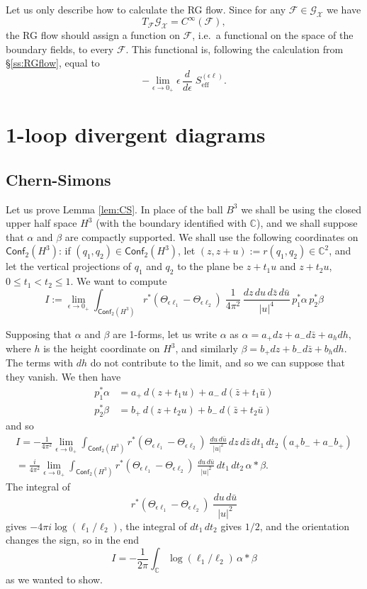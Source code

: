 \documentclass[a4paper]{amsart}
\theoremstyle{plain}
\theoremstyle{definition}
\newcommand{\mc}{\mathcal}
\newcommand{\C}{\mathbb{C}}
\newcommand{\cf}{\mathsf{Conf}}
\begin{document}
Let us only describe how to calculate the RG flow.
Since for any $\mc F\in\mc{G}_\mc X$ we have
$$T_\mc F \mc{G}_\mc X =C^\infty(\mc F), $$
the RG flow should assign a function on $\mc F$, i.e.\ a functional on the space of the boundary fields, to every $\mc F$. This functional is, following the calculation from \S\ref{ss:RGflow}, equal to
\begin{equation}\label{akszrg}
-\lim_{\epsilon\to0_+} \epsilon\,\frac d{d\epsilon}\; S_\text{eff}^{(\epsilon\ell)}.
\end{equation}



\appendix

\section{1-loop divergent diagrams}
\subsection{Chern-Simons}
Let us prove Lemma \ref{lem:CS}. In place of the ball $B^3$ we shall be using the closed upper half space $H^3$ (with the boundary identified with $\C$), and we shall suppose that $\alpha$ and $\beta$ are compactly supported. We shall use the following coordinates on $\cf_2(H^3)$: if $(q_1,q_2)\in\cf_2(H^3)$, let $(z,z+u):=r(q_1,q_2)\in\C^2$, and let the vertical projections of $q_1$ and $q_2$ to the plane be $z+t_1u$ and $z+t_2u$, $0\leq t_1<t_2\leq1$. We want to compute
$$I:=
\lim_{\epsilon\to0_+}\int_{\cf_2(H^3)}r^*(\Theta_{\epsilon\ell_1}-\Theta_{\epsilon\ell_2})\;\frac1{4\pi^2}\,\frac{dz\,du\,d\bar z\,d\bar u}{|u|^4}\,p_1^*\alpha\, p_2^*\beta
$$

Supposing that $\alpha$ and $\beta$ are 1-forms, let us write $\alpha$ as $\alpha=a_+dz + a_-d\bar z + a_h dh$, where $h$ is the height coordinate on $H^3$, and similarly 
$\beta=b_+dz + b_-d\bar z + b_h dh$. The terms with $dh$ do not contribute to the limit, and so we can suppose that they vanish. We then have
\begin{align*}
p_1^*\alpha&=a_+\, d(z+t_1 u) + a_-\, d(\bar z + t_1\bar u)\\
p_2^*\beta&=b_+\, d(z+t_2 u) + b_-\, d(\bar z + t_2\bar u)
\end{align*}
and so
\begin{multline*}
I=-\frac1{4\pi^2}\lim_{\epsilon\to0_+}\int_{\cf_2(H^3)}r^*(\Theta_{\epsilon\ell_1}-\Theta_{\epsilon\ell_2})\;\frac{du\,d\bar u}{|u|^2}\,dz\,d\bar z\,dt_1\,dt_2\,(a_+b_-+a_-b_+) \\
=\frac i{4\pi^2}\lim_{\epsilon\to0_+}\int_{\cf_2(H^3)}r^*(\Theta_{\epsilon\ell_1}-\Theta_{\epsilon\ell_2})\;\frac{du\,d\bar u}{|u|^2}\,dt_1\,dt_2\,\alpha *\beta.
\end{multline*}
The integral of 
$$r^*(\Theta_{\epsilon\ell_1}-\Theta_{\epsilon\ell_2})\;\frac{du\,d\bar u}{|u|^2}$$
gives $-4\pi i\log(\ell_1/\ell_2)$, the integral of $dt_1\,dt_2$ gives $1/2$, and the orientation changes the sign, so in the end
$$I=-\frac1{2\pi}\int_\C\log(\ell_1/\ell_2)\,\alpha*\beta$$
as we wanted to show.
\end{document}
